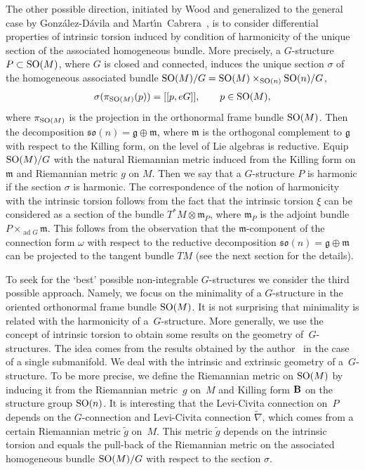 \documentclass[pdftex]{sigma}
\numberwithin{equation}{section}
\begin{document}
The other possible direction, initiated by Wood \cite{cw3} and generalized to the general case by Gonz{\'a}lez-D{\'a}vila and Mart{\'{\i}}n~Cabrera~\cite{gmc2}, is to consider dif\/ferential properties of intrinsic torsion induced by condition of harmonicity of the unique section of the associated homogeneous bundle. More precisely, a $G$-structure $P\subset {\rm SO}(M)$, where $G$ is closed and connected, induces the unique section $\sigma$ of the homogeneous associated bundle ${\rm SO}(M)/G={\rm SO}(M)\times_{{\rm SO}(n)} {\rm SO}(n)/G$,
\begin{gather*}
\sigma(\pi_{{\rm SO}(M)}(p))=[[p,eG]],\qquad p\in {\rm SO}(M),
\end{gather*}
where $\pi_{{\rm SO}(M)}$ is the projection in the orthonormal frame bundle ${\rm SO}(M)$. Then the decomposition $\mathfrak{so}(n)=\mathfrak{g}\oplus\mathfrak{m}$, where $\mathfrak{m}$ is the orthogonal complement to $\mathfrak{g}$ with respect to the Killing form, on the level of Lie algebras is reductive. Equip ${\rm SO}(M)/G$ with the natural Riemannian metric induced from the Killing form on $\mathfrak{m}$ and Riemannian metric $g$ on $M$. Then we say that a $G$-structure $P$ is harmonic if the section $\sigma$ is harmonic. The correspondence of the notion of harmonicity with the intrinsic torsion follows from the fact that the intrinsic torsion $\xi$ can be considered as a section of the bundle $T^{\ast}M\otimes\mathfrak{m}_P$, where $\mathfrak{m}_P$ is the adjoint bundle $P\times_{\operatorname{ad}G}\mathfrak{m}$. This follows from the observation that the $\mathfrak{m}$-component of the connection form $\omega$ with respect to the reductive decomposition $\mathfrak{so}(n)=\mathfrak{g}\oplus\mathfrak{m}$ can be projected to the tangent bundle $TM$ (see the next section for the details).

To seek for the `best' possible non-integrable $G$-structures we consider the third possible approach. Namely, we focus on the minimality of a $G$-structure in the oriented orthonormal frame bundle ${\rm SO}(M)$. It is not surprising that minimality is related with the harmonicity of a~$G$-structure. More generally, we use the concept of intrinsic torsion to obtain some results on the geometry of~$G$-structures. The idea comes from the results obtained by the author~\cite{kn} in the case of a single submanifold. We deal with the intrinsic and extrinsic geometry of a~$G$-structure. To be more precise, we def\/ine the Riemannian metric on ${\rm SO}(M)$ by inducing it from the Riemannian metric~$g$ on~$M$ and Killing form ${\bf B}$ on the structure group ${\rm SO}(n)$. It is interesting that the Levi-Civita connection on~$P$ depends on the $G$-connection and Levi-Civita connection $\tilde{\nabla}$, which comes from a certain Riemannian metric $\tilde{g}$ on~$M$. This metric $\tilde{g}$ depends on the intrinsic torsion and equals the pull-back of the Riemannian metric on the associated homogeneous bundle ${\rm SO}(M)/G$ with respect to the section $\sigma$.
\end{document}
